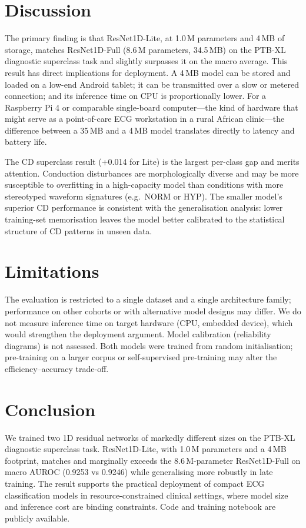 \documentclass[11pt]{article}
\begin{document}
\section{Discussion}
The primary finding is that ResNet1D-Lite, at 1.0\,M parameters and
4\,MB of storage, matches ResNet1D-Full (8.6\,M parameters, 34.5\,MB)
on the PTB-XL diagnostic superclass task and slightly surpasses it
on the macro average. This result has direct implications for deployment.
A 4\,MB model can be stored and loaded on a low-end Android tablet;
it can be transmitted over a slow or metered connection; and its inference
time on CPU is proportionally lower. For a Raspberry Pi 4 or comparable
single-board computer---the kind of hardware that might serve as a
point-of-care ECG workstation in a rural African clinic---the difference
between a 35\,MB and a 4\,MB model translates directly to latency and
battery life.

The CD superclass result (+0.014 for Lite) is the largest per-class
gap and merits attention. Conduction disturbances are morphologically
diverse and may be more susceptible to overfitting in a high-capacity
model than conditions with more stereotyped waveform signatures
(e.g.~NORM or HYP). The smaller model's superior CD performance
is consistent with the generalisation analysis: lower training-set
memorisation leaves the model better calibrated to the statistical
structure of CD patterns in unseen data.

\section{Limitations}
The evaluation is restricted to a single dataset and a single architecture
family; performance on other cohorts or with alternative model designs
may differ. We do not measure inference time on target hardware (CPU,
embedded device), which would strengthen the deployment argument. Model
calibration (reliability diagrams) is not assessed. Both models were
trained from random initialisation; pre-training on a larger corpus or
self-supervised pre-training may alter the efficiency--accuracy trade-off.

\section{Conclusion}
We trained two 1D residual networks of markedly different sizes on the
PTB-XL diagnostic superclass task. ResNet1D-Lite, with 1.0\,M parameters
and a 4\,MB footprint, matches and marginally exceeds the 8.6\,M-parameter
ResNet1D-Full on macro AUROC (0.9253 vs 0.9246) while generalising more
robustly in late training. The result supports the practical deployment
of compact ECG classification models in resource-constrained clinical
settings, where model size and inference cost are binding constraints.
Code and training notebook are publicly available.
\end{document}
